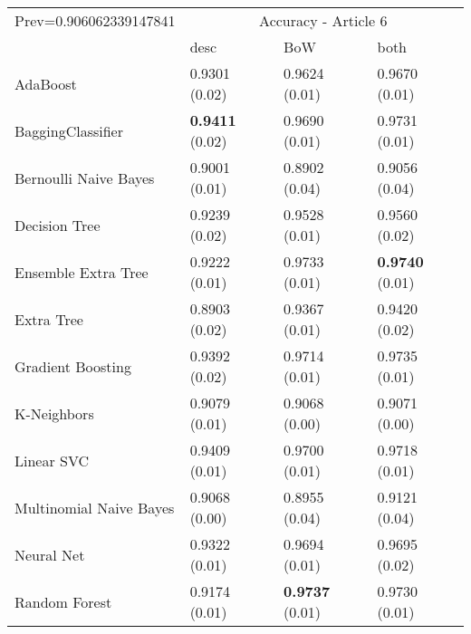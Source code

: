 \begin{tabular}{|l|l|l|l| }
\hline
Prev=0.906062339147841 &  \multicolumn{3}{c|}{Accuracy - Article 6} \\
\cline{2-4} & desc & BoW & both \\ \hline
AdaBoost                & 0.9301 (0.02) & 0.9624 (0.01) & 0.9670 (0.01)\\
BaggingClassifier       & {\bf 0.9411} (0.02) & 0.9690 (0.01) & 0.9731 (0.01)\\
Bernoulli Naive Bayes   & 0.9001 (0.01) & 0.8902 (0.04) & 0.9056 (0.04)\\
Decision Tree           & 0.9239 (0.02) & 0.9528 (0.01) & 0.9560 (0.02)\\
Ensemble Extra Tree     & 0.9222 (0.01) & 0.9733 (0.01) & {\bf 0.9740} (0.01)\\
Extra Tree              & 0.8903 (0.02) & 0.9367 (0.01) & 0.9420 (0.02)\\
Gradient Boosting       & 0.9392 (0.02) & 0.9714 (0.01) & 0.9735 (0.01)\\
K-Neighbors             & 0.9079 (0.01) & 0.9068 (0.00) & 0.9071 (0.00)\\
Linear SVC              & 0.9409 (0.01) & 0.9700 (0.01) & 0.9718 (0.01)\\
Multinomial Naive Bayes & 0.9068 (0.00) & 0.8955 (0.04) & 0.9121 (0.04)\\
Neural Net              & 0.9322 (0.01) & 0.9694 (0.01) & 0.9695 (0.02)\\
Random Forest           & 0.9174 (0.01) & {\bf 0.9737} (0.01) & 0.9730 (0.01)\\
\hline
\end{tabular}